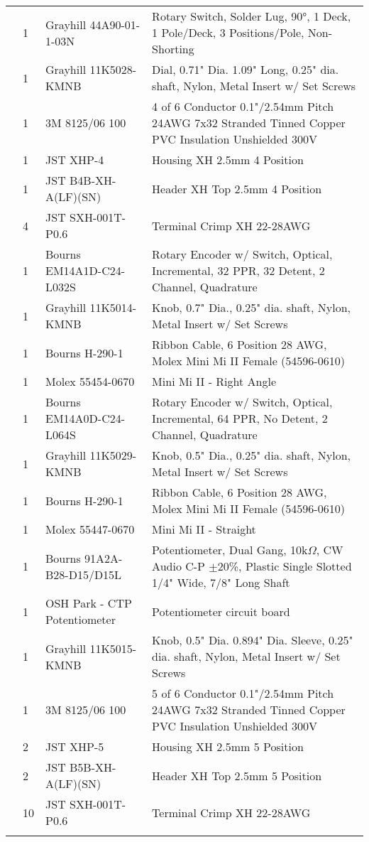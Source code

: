 \begin{longtabu}{X[3,c,m] X[1,c,m] X[3,c,m] X[5,l,m]}
   & 1 & Grayhill 44A90-01-1-03N & Rotary Switch, Solder Lug, 90°, 1 Deck, 1 Pole/Deck, 3 Positions/Pole, Non-Shorting \\
  & 1 & Grayhill 11K5028-KMNB & Dial, 0.71" Dia. 1.09" Long, 0.25" dia. shaft, Nylon, Metal Insert w/ Set Screws \\
  & 1 & 3M 8125/06 100 & 4 of 6 Conductor 0.1"/2.54mm Pitch 24AWG 7x32 Stranded Tinned Copper PVC Insulation Unshielded 300V \\
  & 1 & JST XHP-4 & Housing XH 2.5mm 4 Position \\
  & 1 & JST B4B-XH-A(LF)(SN) & Header XH Top 2.5mm 4 Position \\
  & 4 & JST SXH-001T-P0.6 & Terminal Crimp XH 22-28AWG \\ \mrule

   & 1 & Bourns EM14A1D-C24-L032S & Rotary Encoder w/ Switch, Optical, Incremental, 32 PPR, 32 Detent, 2 Channel, Quadrature \\
  & 1 & Grayhill 11K5014-KMNB & Knob, 0.7" Dia., 0.25" dia. shaft, Nylon, Metal Insert w/ Set Screws \\
  & 1 & Bourns H-290-1 & Ribbon Cable, 6 Position 28 AWG, Molex Mini Mi II Female (54596-0610) \\
  & 1 & Molex 55454-0670 & Mini Mi II - Right Angle \\ \mrule

   & 1 & Bourns EM14A0D-C24-L064S & Rotary Encoder w/ Switch, Optical, Incremental, 64 PPR, No Detent, 2 Channel, Quadrature \\
  & 1 & Grayhill 11K5029-KMNB & Knob, 0.5" Dia., 0.25" dia. shaft, Nylon, Metal Insert w/ Set Screws \\
  & 1 & Bourns H-290-1 & Ribbon Cable, 6 Position 28 AWG, Molex Mini Mi II Female (54596-0610) \\
  & 1 & Molex 55447-0670 & Mini Mi II - Straight \\ \mrule

   & 1 & Bourns 91A2A-B28-D15/D15L & Potentiometer, Dual Gang, 10k$\Omega$, CW Audio C-P $\pm$20\%, Plastic Single Slotted 1/4" Wide, 7/8" Long Shaft \\
  & 1 & OSH Park - CTP Potentiometer & Potentiometer circuit board \\
  & 1 & Grayhill 11K5015-KMNB & Knob, 0.5" Dia. 0.894" Dia. Sleeve, 0.25" dia. shaft, Nylon, Metal Insert w/ Set Screws \\
  & 1 & 3M 8125/06 100 & 5 of 6 Conductor 0.1"/2.54mm Pitch 24AWG 7x32 Stranded Tinned Copper PVC Insulation Unshielded 300V \\
  & 2 & JST XHP-5 & Housing XH 2.5mm 5 Position \\
  & 2 & JST B5B-XH-A(LF)(SN) & Header XH Top 2.5mm 5 Position \\
  & 10 & JST SXH-001T-P0.6 & Terminal Crimp XH 22-28AWG \\ \mrule


\end{longtabu}
